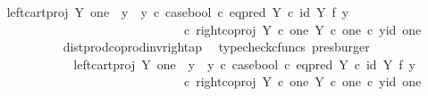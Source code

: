 \begin{isabellebody}
\ \isamarkupfalse%
\ {\isachardoublequoteopen}{\isachardot}{\kern0pt}{\isachardot}{\kern0pt}{\isachardot}{\kern0pt}\ {\isacharequal}{\kern0pt}\ {\isacharparenleft}{\kern0pt}left{\isacharunderscore}{\kern0pt}cart{\isacharunderscore}{\kern0pt}proj\ Y\ one\ {\isasymamalg}\ {\isacharparenleft}{\kern0pt}{\isacharparenleft}{\kern0pt}y{}\ {\isasymamalg}\ y{}{\isacharparenright}{\kern0pt}\ {\isasymcirc}\isactrlsub c\ case{\isacharunderscore}{\kern0pt}bool\ {\isasymcirc}\isactrlsub c\ eq{\isacharunderscore}{\kern0pt}pred\ Y\ {\isasymcirc}\isactrlsub c\ {\isacharparenleft}{\kern0pt}id\ Y\ {\isasymtimes}\isactrlsub f\ y{}{\isacharparenright}{\kern0pt}{\isacharparenright}{\kern0pt}{\isacharparenright}{\kern0pt}\isanewline
\ \ \ \ \ \ \ \ \ \ \ \ \ \ \ \ \ \ \ \ \ \ \ \ \ \ \ \ \ \ \ \ \ {\isasymcirc}\isactrlsub c\ right{\isacharunderscore}{\kern0pt}coproj\ {\isacharparenleft}{\kern0pt}Y\ {\isasymtimes}\isactrlsub c\ one{\isacharparenright}{\kern0pt}\ {\isacharparenleft}{\kern0pt}Y\ {\isasymtimes}\isactrlsub c\ one{\isacharparenright}{\kern0pt}\ {\isasymcirc}\isactrlsub c\ {\isasymlangle}y{\isacharcomma}{\kern0pt}id\ one{\isasymrangle}{\isachardoublequoteclose}\isanewline
\ \ \ \ \ \ \ \ \ \ \ \ \isamarkupfalse%
\ dist{\isacharunderscore}{\kern0pt}prod{\isacharunderscore}{\kern0pt}coprod{\isacharunderscore}{\kern0pt}inv{\isacharunderscore}{\kern0pt}right{\isacharunderscore}{\kern0pt}ap\ \isamarkupfalse%
\ {\isacharparenleft}{\kern0pt}typecheck{\isacharunderscore}{\kern0pt}cfuncs{\isacharcomma}{\kern0pt}\ presburger{\isacharparenright}{\kern0pt}\isanewline
\ \ \ \ \ \ \ \ \ \ \isamarkupfalse%
\ \isamarkupfalse%
\ {\isachardoublequoteopen}{\isachardot}{\kern0pt}{\isachardot}{\kern0pt}{\isachardot}{\kern0pt}\ {\isacharequal}{\kern0pt}\ {\isacharparenleft}{\kern0pt}{\isacharparenleft}{\kern0pt}left{\isacharunderscore}{\kern0pt}cart{\isacharunderscore}{\kern0pt}proj\ Y\ one\ {\isasymamalg}\ {\isacharparenleft}{\kern0pt}{\isacharparenleft}{\kern0pt}y{}\ {\isasymamalg}\ y{}{\isacharparenright}{\kern0pt}\ {\isasymcirc}\isactrlsub c\ case{\isacharunderscore}{\kern0pt}bool\ {\isasymcirc}\isactrlsub c\ eq{\isacharunderscore}{\kern0pt}pred\ Y\ {\isasymcirc}\isactrlsub c\ {\isacharparenleft}{\kern0pt}id\ Y\ {\isasymtimes}\isactrlsub f\ y{}{\isacharparenright}{\kern0pt}{\isacharparenright}{\kern0pt}{\isacharparenright}{\kern0pt}\ \isanewline
\ \ \ \ \ \ \ \ \ \ \ \ \ \ \ \ \ \ \ \ \ \ \ \ \ \ \ \ \ \ \ \ \ {\isasymcirc}\isactrlsub c\ right{\isacharunderscore}{\kern0pt}coproj\ {\isacharparenleft}{\kern0pt}Y\ {\isasymtimes}\isactrlsub c\ one{\isacharparenright}{\kern0pt}\ {\isacharparenleft}{\kern0pt}Y\ {\isasymtimes}\isactrlsub c\ one{\isacharparenright}{\kern0pt}{\isacharparenright}{\kern0pt}\ {\isasymcirc}\isactrlsub c\ {\isasymlangle}y{\isacharcomma}{\kern0pt}id\ one{\isasymrangle}{\isachardoublequoteclose}\isanewline

\end{isabellebody}
